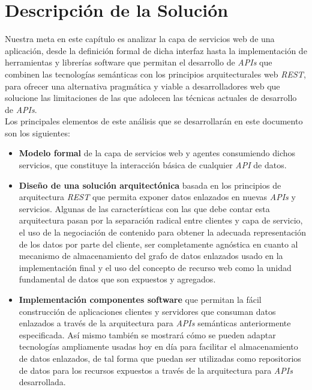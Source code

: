 \chapter{Descripci\'on de la Soluci\'on}

Nuestra meta en este cap\'itulo es analizar la capa de servicios web de una aplicaci\'on, desde la definici\'on formal de dicha interfaz hasta la implementaci\'on de herramientas y librer\'ias software que permitan el desarrollo de \textit{APIs} que combinen las tecnolog\'ias sem\'anticas con los principios arquitecturales web \textit{REST}, para ofrecer una alternativa pragm\'atica y viable a desarrolladores web que solucione las limitaciones de las que adolecen las t\'ecnicas actuales de desarrollo de \textit{APIs}.\\
Los principales elementos de este an\'alisis que se desarrollar\'an en este documento son los siguientes:\\

\begin{itemize}

\item \textbf{Modelo formal} de la capa de servicios web y agentes consumiendo dichos servicios, que constituye la interacci\'on b\'asica de cualquier \textit{API} de datos.

\item \textbf{Dise\~no de una soluci\'on arquitect\'onica} basada en los principios de arquitectura \textit{REST} que permita exponer datos enlazados en nuevas \textit{APIs} y servicios. Algunas de las caracter\'isticas con las que debe contar esta arquitectura pasan por la separaci\'on radical entre clientes y capa de servicio, el uso de la negociaci\'on de contenido para obtener la adecuada representaci\'on de los datos por parte del cliente, ser completamente agn\'ostica en cuanto al mecanismo de almacenamiento del grafo de datos enlazados usado en la implementaci\'on final y el uso del concepto de recurso web como la unidad fundamental de datos que son expuestos y agregados.

\item \textbf{Implementaci\'on componentes software} que permitan la f\'acil construcci\'on de aplicaciones clientes y servidores que consuman datos enlazados a trav\'es de la arquitectura para \textit{APIs} sem\'anticas anteriormente especificada. As\'i mismo tambi\'en se mostrar\'a c\'omo se pueden adaptar tecnolog\'ias  ampliamente usadas hoy en d\'ia para facilitar el almacenamiento de datos enlazados, de tal forma que puedan ser utilizadas como repositorios de datos para los recursos expuestos a trav\'es de la arquitectura para \textit{APIs} desarrollada.

\end{itemize}

